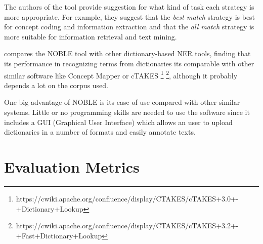 \begin{table}[ht]
\centering
{}
\caption{NOBLE matching strategies present in the GUI interface. Adapted from \citep{Tseytlin2016}. This correspond to the options used in the GUI tool.}
\label{table:matching-strategies}
\end{table}

The authors of the tool provide suggestion for what kind of task each strategy is more appropriate. For example, they suggest that the \textit{best match} strategy is best for concept coding and information extraction and that the \textit{all match} strategy is more suitable for information retrieval and text mining.

\citep{Tseytlin2016} compares the NOBLE tool with other dictionary-based NER tools, finding that its performance in recognizing terms from dictionaries its comparable with other similar software like Concept Mapper \citep{Stewart} or cTAKES \footnote{https://cwiki.apache.org/confluence/display/CTAKES/cTAKES+3.0+-+Dictionary+Lookup} \footnote{https://cwiki.apache.org/confluence/display/CTAKES/cTAKES+3.2+-+Fast+Dictionary+Lookup}, although it probably depends a lot on the corpus used.

One big advantage of NOBLE is its ease of use compared with other similar systems. Little or no programming skills are needed to use the software since it includes a GUI (Graphical User Interface) which allows an user to upload dictionaries in a number of formats and easily annotate texts. 

\section{Evaluation Metrics}

